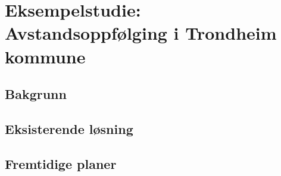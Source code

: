 \chapter{Eksempelstudie: Avstandsoppfølging i Trondheim kommune}
\label{ch:case}
\blindtext

\section{Bakgrunn}
\blindtext

\section{Eksisterende løsning}
\blindtext

\section{Fremtidige planer}
\blindtext
